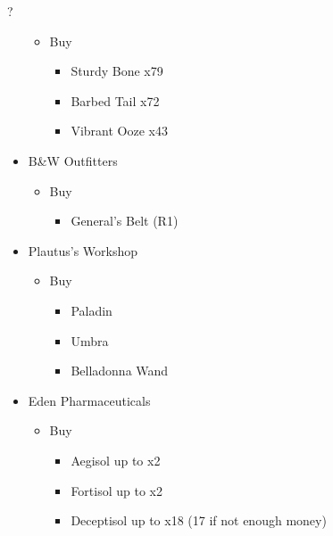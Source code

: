 \begin{shop}{?}
\begin{itemize}
			\begin{itemize}
				\item Buy
					\begin{itemize}
						\item Sturdy Bone x79
						\item Barbed Tail x72
						\item Vibrant Ooze x43
					\end{itemize}
			\end{itemize}
		\item B\&W Outfitters
			\begin{itemize}
				\item Buy
					\begin{itemize}
						\item General's Belt (R1)
					\end{itemize}
			\end{itemize}
		\item Plautus's Workshop
			\begin{itemize}
				\item Buy
					\begin{itemize}
						\item Paladin
						\item Umbra
						\item Belladonna Wand
					\end{itemize}
			\end{itemize}	
		\item Eden Pharmaceuticals
			\begin{itemize}
				\item Buy
					\begin{itemize}
						\item Aegisol up to x2
						\item Fortisol up to x2
						\item Deceptisol up to x18 (17 if not enough money)
					\end{itemize}
			\end{itemize}											
	\end{itemize}
\end{shop}

